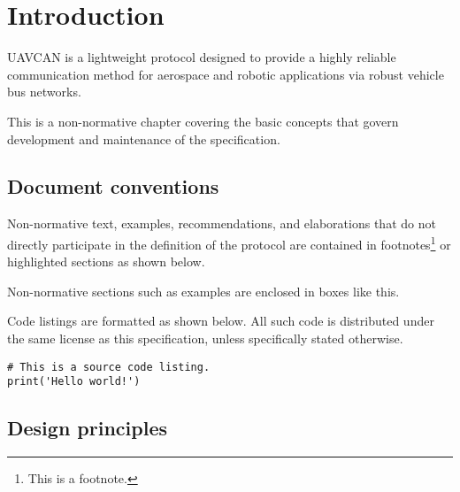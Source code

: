 \chapter{Introduction}\label{sec:introduction}

UAVCAN is a lightweight protocol designed to provide a highly reliable communication method for
aerospace and robotic applications via robust vehicle bus networks.

This is a non-normative chapter covering the basic concepts that govern development and maintenance of
the specification.

\section{Document conventions}

Non-normative text, examples, recommendations, and elaborations that do not directly participate
in the definition of the protocol are contained in footnotes\footnote{This is a footnote.}
or highlighted sections as shown below.

\begin{remark}
    Non-normative sections such as examples are enclosed in boxes like this.
\end{remark}

Code listings are formatted as shown below.
All such code is distributed under the same license as this specification, unless specifically stated otherwise.

\begin{verbatim}
# This is a source code listing.
print('Hello world!')
\end{verbatim}

\section{Design principles}

